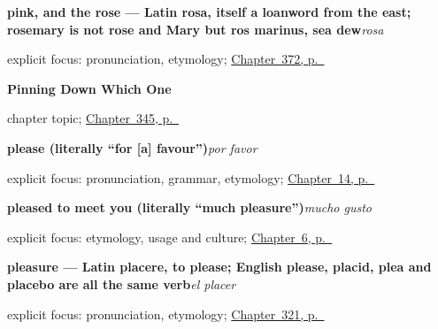 \noindent\begin{minipage}[t]{\linewidth}
\raggedright
\textbf{pink, and the rose — Latin rosa, itself a loanword from the east; rosemary is not rose and Mary but ros marinus, sea dew}\enspace\emph{rosa}\par
\footnotesize explicit focus: pronunciation, etymology; \hyperref[ch:gris-y-rosa]{Chapter~372, p.~\pageref*{ch:gris-y-rosa}}
\end{minipage}\par\smallskip

\noindent\begin{minipage}[t]{\linewidth}
\raggedright
\textbf{Pinning Down Which One}\par
\footnotesize chapter topic; \hyperref[ch:cada-y-mismo]{Chapter~345, p.~\pageref*{ch:cada-y-mismo}}
\end{minipage}\par\smallskip

\noindent\begin{minipage}[t]{\linewidth}
\raggedright
\textbf{please (literally \textquotedblleft{}for {[}a{]} favour\textquotedblright{})}\enspace\emph{por favor}\par
\footnotesize explicit focus: pronunciation, grammar, etymology; \hyperref[ch:a-coffee]{Chapter~14, p.~\pageref*{ch:a-coffee}}
\end{minipage}\par\smallskip

\noindent\begin{minipage}[t]{\linewidth}
\raggedright
\textbf{pleased to meet you (literally \textquotedblleft{}much pleasure\textquotedblright{})}\enspace\emph{mucho gusto}\par
\footnotesize explicit focus: etymology, usage and culture; \hyperref[ch:asking-a-name]{Chapter~6, p.~\pageref*{ch:asking-a-name}}
\end{minipage}\par\smallskip

\noindent\begin{minipage}[t]{\linewidth}
\raggedright
\textbf{pleasure — Latin placere, to please; English please, placid, plea and placebo are all the same verb}\enspace\emph{el placer}\par
\footnotesize explicit focus: pronunciation, etymology; \hyperref[ch:placer-y-consejo]{Chapter~321, p.~\pageref*{ch:placer-y-consejo}}
\end{minipage}\par\smallskip

